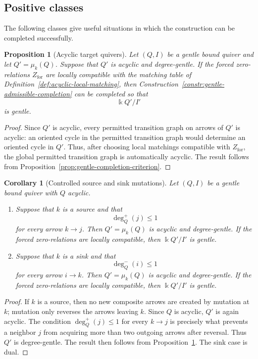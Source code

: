 \documentclass[11pt]{article}
\newcommand{\K}{\Bbbk}
\theoremstyle{plain}
\newtheorem{proposition}[theorem]{Proposition}
\newtheorem{corollary}[theorem]{Corollary}
\theoremstyle{definition}
\theoremstyle{remark}
\begin{document}
\subsection{Positive classes}

The following classes give useful situations in which the construction can be
completed successfully.

\begin{proposition}[Acyclic target quivers]
\label{prop:acyclic-target-gentle}
Let \((Q,I)\) be a gentle bound quiver and let \(Q'=\mu_k(Q)\).  Suppose that
\(Q'\) is acyclic and degree-gentle.  If the forced zero-relations
\(Z_{\mathrm{for}}\) are locally compatible with the matching table of
Definition~\ref{def:acyclic-local-matching}, then
Construction~\ref{constr:gentle-admissible-completion} can be completed so that
\[
  \K Q'/I'
\]
is gentle.
\end{proposition}

\begin{proof}
Since \(Q'\) is acyclic, every permitted transition graph on arrows of \(Q'\) is
acyclic: an oriented cycle in the permitted transition graph would determine an
oriented cycle in \(Q'\).  Thus, after choosing local matchings compatible with
\(Z_{\mathrm{for}}\), the global permitted transition graph is automatically
acyclic.  The result follows from Proposition~\ref{prop:gentle-completion-criterion}.
\end{proof}

\begin{corollary}[Controlled source and sink mutations]
\label{cor:controlled-source-sink}
Let \((Q,I)\) be a gentle bound quiver with \(Q\) acyclic.
\begin{enumerate}[label=\textup{(\alph*)},leftmargin=3em]
  \item Suppose that \(k\) is a source and that
  \[
    \deg_Q^+(j)\leq 1
  \]
  for every arrow \(k\to j\).  Then \(Q'=\mu_k(Q)\) is acyclic and
  degree-gentle.  If the forced zero-relations are locally compatible, then
  \(\K Q'/I'\) is gentle.

  \item Suppose that \(k\) is a sink and that
  \[
    \deg_Q^-(i)\leq 1
  \]
  for every arrow \(i\to k\).  Then \(Q'=\mu_k(Q)\) is acyclic and
  degree-gentle.  If the forced zero-relations are locally compatible, then
  \(\K Q'/I'\) is gentle.
\end{enumerate}
\end{corollary}

\begin{proof}
If \(k\) is a source, then no new composite arrows are created by mutation at
\(k\); mutation only reverses the arrows leaving \(k\).  Since \(Q\) is acyclic,
\(Q'\) is again acyclic.  The condition \(\deg_Q^+(j)\leq 1\) for every
\(k\to j\) is precisely what prevents a neighbor \(j\) from acquiring more than
two outgoing arrows after reversal.  Thus \(Q'\) is degree-gentle.  The result
then follows from Proposition~\ref{prop:acyclic-target-gentle}.  The sink case
is dual.
\end{proof}
\end{document}
